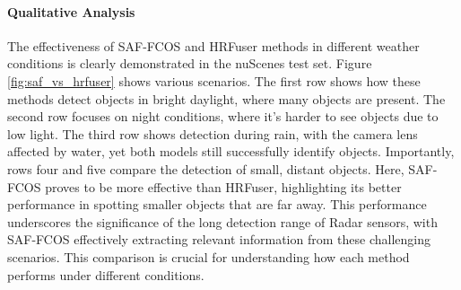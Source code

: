 \documentclass[report.tex]{subfiles}
\begin{document}
    \paragraph*{Qualitative Analysis}

    The effectiveness of SAF-FCOS and HRFuser methods in different weather conditions is clearly demonstrated in the nuScenes test set. Figure \ref{fig:saf_vs_hrfuser} shows various scenarios. The first row shows how these methods detect objects in bright daylight, where many objects are present. The second row focuses on night conditions, where it's harder to see objects due to low light. The third row shows detection during rain, with the camera lens affected by water, yet both models still successfully identify objects. Importantly, rows four and five compare the detection of small, distant objects. Here, SAF-FCOS proves to be more effective than HRFuser, highlighting its better performance in spotting smaller objects that are far away. This performance underscores the significance of the long detection range of Radar sensors, with SAF-FCOS effectively extracting relevant information from these challenging scenarios. This comparison is crucial for understanding how each method performs under different conditions.
\end{document}
